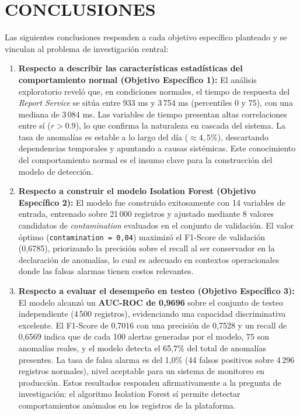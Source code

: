 \documentclass[12pt,letterpaper, oneside]{book}
\begin{document}
    \chapter{CONCLUSIONES}

    Las siguientes conclusiones responden a cada objetivo específico
    planteado y se vinculan al problema de investigación central:

    \begin{enumerate}
        \item \textbf{Respecto a describir las características estadísticas
        del comportamiento normal (Objetivo Específico 1):} El análisis
        exploratorio reveló que, en condiciones normales, el tiempo de
        respuesta del \textit{Report Service} se sitúa entre 933 ms y
        3\,754 ms (percentiles 0 y 75), con una mediana de 3\,084 ms.
        Las variables de tiempo presentan altas correlaciones entre sí
        ($r > 0.9$), lo que confirma la naturaleza en cascada del
        sistema. La tasa de anomalías es estable a lo largo del día
        ($\approx 4,5\%$), descartando dependencias temporales y
        apuntando a causas sistémicas. Este conocimiento del
        comportamiento normal es el insumo clave para la construcción
        del modelo de detección.

        \item \textbf{Respecto a construir el modelo Isolation Forest
        (Objetivo Específico 2):} El modelo fue construido exitosamente
        con 14 variables de entrada, entrenado sobre 21\,000 registros
        y ajustado mediante 8 valores candidatos de \textit{contamination}
        evaluados en el conjunto de validación. El valor óptimo
        (\texttt{contamination = 0,04}) maximizó el F1-Score de
        validación (0,6785), priorizando la precisión sobre el recall
        al ser conservador en la declaración de anomalías, lo cual es
        adecuado en contextos operacionales donde las falsas alarmas
        tienen costos relevantes.

        \item \textbf{Respecto a evaluar el desempeño en testeo (Objetivo
        Específico 3):} El modelo alcanzó un \textbf{AUC-ROC de 0,9696}
        sobre el conjunto de testeo independiente (4\,500 registros),
        evidenciando una capacidad discriminativa excelente. El F1-Score
        de 0,7016 con una precisión de 0,7528 y un recall de 0,6569
        indica que de cada 100 alertas generadas por el modelo, 75 son
        anomalías reales, y el modelo detecta el 65,7\% del total de
        anomalías presentes. La tasa de falsa alarma es del 1,0\% (44
        falsos positivos sobre 4\,296 registros normales), nivel
        aceptable para un sistema de monitoreo en producción.
        Estos resultados responden afirmativamente a la pregunta de
        investigación: el algoritmo Isolation Forest sí permite detectar
        comportamientos anómalos en los registros de la plataforma.


\end{enumerate}
\end{document}
